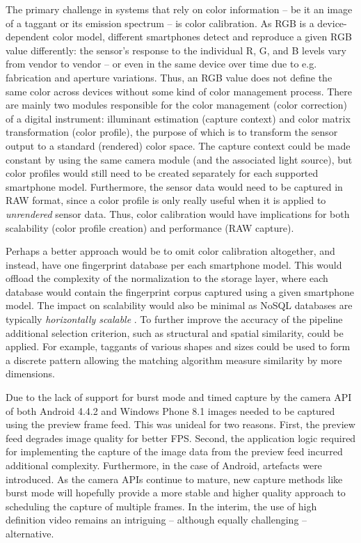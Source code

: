 \documentclass[thesis.tex]{subfiles}
\begin{document}
The primary challenge in systems that rely on color information -- be it an image of a taggant or its emission spectrum -- is color calibration. As RGB is a device-dependent color model, different smartphones detect and reproduce a given RGB value differently: the sensor's response to the individual R, G, and B levels vary from vendor to vendor -- or even in the same device over time due to e.g. fabrication and aperture variations. Thus, an RGB value does not define the same color across devices without some kind of color management process. There are mainly two modules responsible for the color management (color correction) of a digital instrument: illuminant estimation (capture context) and color matrix transformation (color profile), the purpose of which is to transform the sensor output to a standard (rendered) color space. The capture context could be made constant by using the same camera module (and the associated light source), but color profiles would still need to be created separately for each supported smartphone model. Furthermore, the sensor data would need to be captured in RAW format, since a color profile is only really useful when it is applied to \emph{unrendered} sensor data. Thus, color calibration would have implications for both scalability (color profile creation) and performance (RAW capture). \cite{multiple_cameras} \cite{color_correction_pipeline}

Perhaps a better approach would be to omit color calibration altogether, and instead, have one fingerprint database per each smartphone model. This would offload the complexity of the normalization to the storage layer, where each database would contain the fingerprint corpus captured using a given smartphone model. The impact on scalability would also be minimal as NoSQL databases are typically \emph{horizontally scalable} \cite{nosql_scalability}. To further improve the accuracy of the pipeline additional selection criterion, such as structural and spatial similarity, could be applied. For example, taggants of various shapes and sizes could be used to form a discrete pattern allowing the matching algorithm measure similarity by more dimensions. %

Due to the lack of support for burst mode and timed capture by the camera API of both Android 4.4.2 and Windows Phone 8.1 images needed to be captured using the preview frame feed. This was unideal for two reasons. First, the preview feed degrades image quality for better FPS. Second, the application logic required for implementing the capture of the image data from the preview feed incurred additional complexity. Furthermore, in the case of Android, artefacts were introduced. As the camera APIs continue to mature, new capture methods like burst mode will hopefully provide a more stable and higher quality approach to scheduling the capture of multiple frames. In the interim, the use of high definition video remains an intriguing -- although equally challenging -- alternative.
\end{document}
